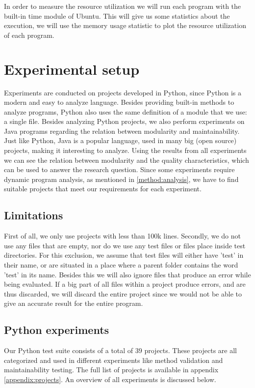 \documentclass[twoside]{uva-inf-bachelor-thesis}
\begin{document}
In order to measure the resource utilization we will run each program with the built-in time module of Ubuntu. This will give us some statistics about the execution, we will use the memory usage statistic to plot the resource utilization of each program.

\chapter{Experimental setup}
\label{chapter:setup}
Experiments are conducted on projects developed in Python, since Python is a modern and easy to analyze language. Besides providing built-in methods to analyze programs, Python also uses the same definition of a module that we use: a single file. Besides analyzing Python projects, we also perform experiments on Java programs regarding the relation between modularity and maintainability. Just like Python, Java is a popular language, used in many big (open source) projects, making it interesting to analyze. Using the results from all experiments we can see the relation between modularity and the quality characteristics, which can be used to answer the research question. Since some experiments require dynamic program analysis, as mentioned in \autoref{method:analysis}, we have to find suitable projects that meet our requirements for each experiment.

\section{Limitations}
First of all, we only use projects with less than 100k lines. Secondly, we do not use any files that are empty, nor do we use any test files or files place inside test directories. For this exclusion, we assume that test files will either have 'test' in their name, or are situated in a place where a parent folder contains the word 'test' in its name. Besides this we will also ignore files that produce an error while being evaluated. If a big part of all files within a project produce errors, and are thus discarded, we will discard the entire project since we would not be able to give an accurate result for the entire program.

\section{Python experiments}
Our Python test suite consists of a total of 39 projects. These projects are all categorized and used in different experiments like method validation and maintainability testing. The full list of projects is available in appendix \ref{appendix:projects}. An overview of all experiments is discussed below.
\end{document}
